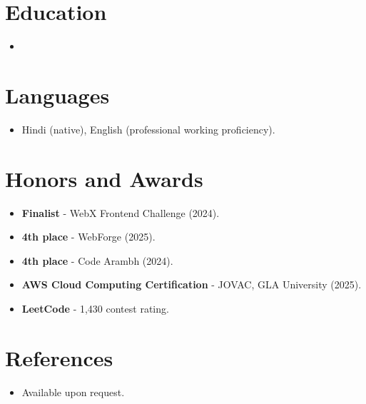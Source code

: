 \documentclass[11pt,a4paper,sans]{moderncv}
\begin{document}
\section{Education}
\vspace{1pt}
\begin{itemize}

\item{}

\end{itemize}


\section{Languages}
\vspace{1pt}
\begin{itemize}
\item {Hindi (native), English (professional working proficiency).}
\end{itemize}


\section{Honors and Awards}
\vspace{1pt}
\begin{itemize}
\item{\textbf{Finalist} - WebX Frontend Challenge (2024).}
\item{\textbf{4th place} - WebForge (2025).}
\item{\textbf{4th place} - Code Arambh (2024).}
\item{\textbf{AWS Cloud Computing Certification} - JOVAC, GLA University (2025).}
\item{\textbf{LeetCode} - 1,430 contest rating.}
\end{itemize}


\section{References}
\vspace{1pt}
\begin{itemize}
\item{Available upon request.}
\end{itemize}
\end{document}
